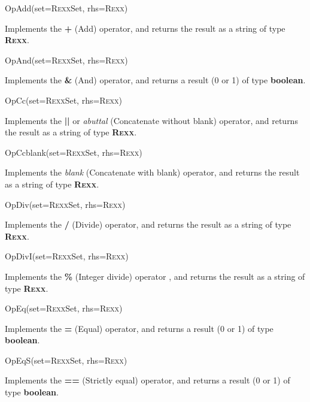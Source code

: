 \begin{description}
\item{OpAdd(set=R\textsc{exx}Set, rhs=R\textsc{exx})}

Implements the \nr{} \textbf{\textbf{+}} (Add) operator,
and returns the result as a string of type \textbf{R\textsc{exx}}.
\item{OpAnd(set=R\textsc{exx}Set, rhs=R\textsc{exx})}

Implements the \nr{} \textbf{\textbf{\&}} (And)
operator,
and returns a result (0 or 1) of type \textbf{boolean}.
\item{OpCc(set=R\textsc{exx}Set, rhs=R\textsc{exx})}

Implements the \nr{} \textbf{\textbf{||}} or
\emph{abuttal} (Concatenate without blank) operator, and
returns the result as a string of type \textbf{R\textsc{exx}}.
\item{OpCcblank(set=R\textsc{exx}Set, rhs=R\textsc{exx})}

Implements the \nr{} \emph{blank} (Concatenate with blank)
operator, and returns the result as a string of type \textbf{R\textsc{exx}}.
\item{OpDiv(set=R\textsc{exx}Set, rhs=R\textsc{exx})}

Implements the \nr{} \textbf{\textbf{/}} (Divide) operator,
and returns the result as a string of type \textbf{R\textsc{exx}}.
\item{OpDivI(set=R\textsc{exx}Set, rhs=R\textsc{exx})}

Implements the \nr{} \textbf{\textbf{\%}} (Integer divide) operator
, and returns the result as a string of type \textbf{R\textsc{exx}}.
\item{OpEq(set=R\textsc{exx}Set, rhs=R\textsc{exx})}

Implements the \nr{} \textbf{\textbf{=}} (Equal) operator,
and returns a result (0 or 1) of type \textbf{boolean}.

\item{OpEqS(set=R\textsc{exx}Set, rhs=R\textsc{exx})}\label{refopeqs}

Implements the \nr{} \textbf{\textbf{==}} (Strictly equal)
operator, and returns a result (0 or 1) of type \textbf{boolean}.


\end{description}
